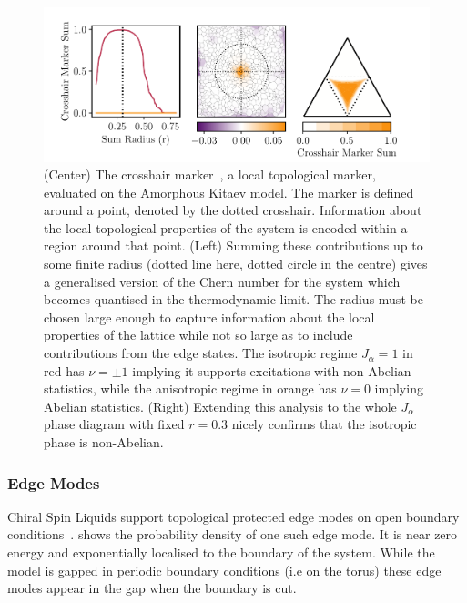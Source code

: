 \hypertarget{fig:phase_diagram_chern}{%
\begin{figure}
\centering
\includegraphics[width=1\textwidth,height=\textheight]{figure_code/amk_chapter/results/phase_diagram_chern/phase_diagram_chern}
\caption[{Local Chern Markers}]{(Center) The crosshair marker~\autocite{peru_preprint}, a local topological marker, evaluated on the Amorphous Kitaev model. The marker is defined around a point, denoted by the dotted crosshair. Information about the local topological properties of the system is encoded within a region around that point. (Left) Summing these contributions up to some finite radius (dotted line here, dotted circle in the centre) gives a generalised version of the Chern number for the system which becomes quantised in the thermodynamic limit. The radius must be chosen large enough to capture information about the local properties of the lattice while not so large as to include contributions from the edge states. The isotropic regime \(J_\alpha = 1\) in red has \(\nu = \pm 1\) implying it supports excitations with non-Abelian statistics, while the anisotropic regime in orange has \(\nu = 0\) implying Abelian statistics. (Right) Extending this analysis to the whole \(J_\alpha\) phase diagram with fixed \(r = 0.3\) nicely confirms that the isotropic phase is non-Abelian.}
\label{fig:phase_diagram_chern}
\end{figure}
}

\hypertarget{edge-modes}{%
\subsubsection{Edge Modes}\label{edge-modes}}

Chiral Spin Liquids support topological protected edge modes on open boundary conditions~\autocite{qi_general_2006}.  shows the probability density of one such edge mode. It is near zero energy and exponentially localised to the boundary of the system. While the model is gapped in periodic boundary conditions (i.e on the torus) these edge modes appear in the gap when the boundary is cut.

